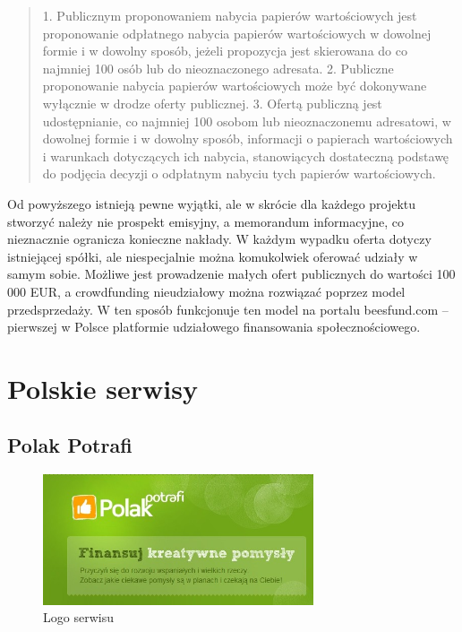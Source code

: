 \documentclass[12pt, a4paper]{article}
\begin{document}
\begin{quote}
1. Publicznym proponowaniem nabycia papierów wartościowych jest proponowanie odpłatnego nabycia papierów wartościowych w dowolnej formie i w dowolny sposób, jeżeli propozycja jest skierowana  do co najmniej 100 osób lub do nieoznaczonego adresata.
2. Publiczne proponowanie nabycia papierów wartościowych może być dokonywane wyłącznie w drodze oferty publicznej.
3. Ofertą publiczną jest udostępnianie, co najmniej 100 osobom lub nieoznaczonemu adresatowi, w dowolnej formie i w dowolny sposób, informacji o papierach wartościowych i warunkach dotyczących ich nabycia, stanowiących dostateczną podstawę do podjęcia decyzji o odpłatnym nabyciu tych papierów wartościowych. \\ %
\end{quote}

Od powyższego istnieją pewne wyjątki, ale w skrócie dla każdego projektu stworzyć należy nie prospekt emisyjny, a memorandum informacyjne, co nieznacznie ogranicza konieczne nakłady. W każdym wypadku oferta dotyczy istniejącej spółki, ale niespecjalnie można komukolwiek oferować udziały w samym sobie. Możliwe jest prowadzenie małych ofert publicznych do wartości 100 000 EUR, a crowdfunding nieudziałowy można rozwiązać poprzez model przedsprzedaży. W ten sposób funkcjonuje ten model na portalu beesfund.com – pierwszej w Polsce platformie udziałowego finansowania społecznościowego.

\newpage

\section{Polskie serwisy}
\label{sec:pserw}

\subsection{Polak Potrafi}
\label{sec:pp}

\begin{figure}[ht]
\centering
\includegraphics[width=8cm]{pp}
\caption{Logo serwisu}
\label{fig:obrazek k}
\end{figure}
\end{document}
